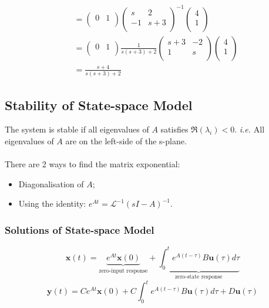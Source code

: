 \documentclass[12pt,a4paper]{article}
\begin{document}
\begin{itemize}
\begin{tcolorbox}[breakable]
\begin{equation*}
\begin{aligned}
&=\begin{pmatrix}
 0 & 1\\
\end{pmatrix}
\begin{pmatrix}
s&2\\
-1&s+3\\
\end{pmatrix}
^{-1}
\begin{pmatrix}
4\\
1\\
\end{pmatrix}\\
&=\begin{pmatrix}
 0 & 1\\
\end{pmatrix}
\frac{1}{s(s+3)+2}
\begin{pmatrix}
s+3&-2\\
1&s\\
\end{pmatrix}
\begin{pmatrix}
4\\
1\\
\end{pmatrix}\\
&= \frac{s+4}{s(s+3)+2}
\end{aligned}
\end{equation*}
\end{tcolorbox}
\end{itemize}

\subsection{Stability of State-space Model}
The system is stable if all eigenvalues of $A$ satisfies $\Re(\lambda_{i})<0$. \textit{i.e.} All eigenvalues of $A$ are on the left-side of the s-plane.\\\\
There are 2 ways to find the matrix exponential:
\begin{itemize}
\item Diagonalisation of $A$;
\item Using the identity: $e^{At} = \mathcal{L}^{-1}(sI-A)^{-1}$.
\end{itemize}

\subsubsection{Solutions of State-space Model}%
\[\mathbf{x}(t) = \underbrace{e^{At}\mathbf{x}(0)}_{\text{zero-input response}}+\underbrace{\int_{0}^{t}e^{A(t-\tau)}B\mathbf{u}(\tau)d\tau}_{\text{zero-state response}}\]
\[\mathbf{y}(t) = Ce^{At}\mathbf{x}(0)+C\int_{0}^{t}e^{A(t-\tau)}B\mathbf{u}(\tau)d\tau+D\mathbf{u}(\tau)\]
\end{document}
